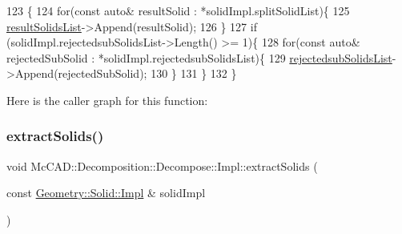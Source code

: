 \begin{DoxyCode}
123                                            \{
124     \textcolor{keywordflow}{for}(\textcolor{keyword}{const} \textcolor{keyword}{auto}& resultSolid : *solidImpl.splitSolidList)\{
125         \hyperlink{classMcCAD_1_1Decomposition_1_1Decompose_1_1Impl_a75b53d768ed797dff26c6bf7308f0bea}{resultSolidsList}->Append(resultSolid);
126     \}
127     \textcolor{keywordflow}{if} (solidImpl.rejectedsubSolidsList->Length() >= 1)\{
128         \textcolor{keywordflow}{for}(\textcolor{keyword}{const} \textcolor{keyword}{auto}& rejectedSubSolid : *solidImpl.rejectedsubSolidsList)\{
129             \hyperlink{classMcCAD_1_1Decomposition_1_1Decompose_1_1Impl_a513935cebc47e2e4dd599963bfbb8008}{rejectedsubSolidsList}->Append(rejectedSubSolid);
130         \}
131     \}
132 \}
\end{DoxyCode}
Here is the caller graph for this function\+:
\mbox{\label{classMcCAD_1_1Decomposition_1_1Decompose_1_1Impl_a72d35db075f7a695c1bf3f99ccf8d8a8}} 
\subsubsection{\texorpdfstring{extract\+Solids()}{extractSolids()}\hspace{0.1cm}{\footnotesize\ttfamily [2/2]}}
{\footnotesize\ttfamily void Mc\+C\+A\+D\+::\+Decomposition\+::\+Decompose\+::\+Impl\+::extract\+Solids (\begin{DoxyParamCaption}\item[{const \hyperlink{classMcCAD_1_1Geometry_1_1Solid_1_1Impl}{Geometry\+::\+Solid\+::\+Impl} \&}]{solid\+Impl }\end{DoxyParamCaption})}

\mbox{\label{classMcCAD_1_1Decomposition_1_1Decompose_1_1Impl_ab0605ffa40a113571d949c93e5994122}} 
